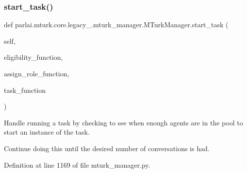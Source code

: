 \subsubsection{\texorpdfstring{start\+\_\+task()}{start\_task()}}
{\footnotesize\ttfamily def parlai.\+mturk.\+core.\+legacy\+\_.\+mturk\+\_\+manager.\+M\+Turk\+Manager.\+start\+\_\+task (\begin{DoxyParamCaption}\item[{}]{self,  }\item[{}]{eligibility\+\_\+function,  }\item[{}]{assign\+\_\+role\+\_\+function,  }\item[{}]{task\+\_\+function }\end{DoxyParamCaption})}

\begin{DoxyVerb}Handle running a task by checking to see when enough agents are in the pool to
start an instance of the task.

Continue doing this until the desired number of conversations is had.
\end{DoxyVerb}
 

Definition at line 1169 of file mturk\+\_\+manager.\+py.


